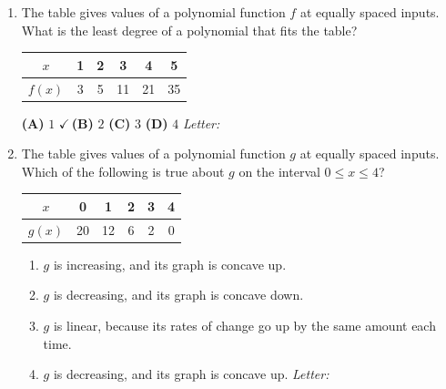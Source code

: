 \documentclass[10pt]{article}
\begin{document}
\begin{enumerate}[leftmargin=1.9em, itemsep=8pt]

\item \begin{minipage}[t]{0.56\linewidth}
      The table gives values of a polynomial function $f$ at equally spaced inputs. What is the
      least degree of a polynomial that fits the table?
      \end{minipage}\hfill
      \begin{minipage}[t]{0.4\linewidth}
      \vspace{-2pt}\centering
      \renewcommand{\arraystretch}{1.2}
      \begin{tabular}{|c|c|c|c|c|c|}
      \hline
      $x$    & 1 & 2 & 3  & 4  & 5  \\ \hline
      $f(x)$ & 3 & 5 & 11 & 21 & 35 \\ \hline
      \end{tabular}
      \end{minipage}

      \smallskip

      \textbf{(A)} $1$ \hspace{3em} {\color{keyred}\textbf{$\checkmark$\,(B)}} $2$ \hspace{3em} \textbf{(C)} $3$ \hspace{3em} \textbf{(D)} $4$ \hfill\textit{Letter:}~\gradedblank[id=ap1, type=choice, points=1, answer=B]{0.42in}{13pt}

\item \begin{minipage}[t]{0.56\linewidth}
      The table gives values of a polynomial function $g$ at equally spaced inputs. Which of the
      following is true about $g$ on the interval $0 \le x \le 4$?
      \end{minipage}\hfill
      \begin{minipage}[t]{0.4\linewidth}
      \vspace{-2pt}\centering
      \renewcommand{\arraystretch}{1.2}
      \begin{tabular}{|c|c|c|c|c|c|}
      \hline
      $x$    & 0  & 1  & 2 & 3 & 4 \\ \hline
      $g(x)$ & 20 & 12 & 6 & 2 & 0 \\ \hline
      \end{tabular}
      \end{minipage}
      \begin{enumerate}[leftmargin=2.6em, itemsep=2pt]
        \item[(A)] $g$ is increasing, and its graph is concave up.
        \item[(B)] $g$ is decreasing, and its graph is concave down.
        \item[(C)] $g$ is linear, because its rates of change go up by the same amount each time.
        \item[{\color{keyred}$\checkmark$\,(D)}] $g$ is decreasing, and its graph is concave up. \hfill\textit{Letter:}~\gradedblank[id=ap2, type=choice, points=1, answer=D]{0.42in}{13pt}
      \end{enumerate}


\end{enumerate}
\end{document}
